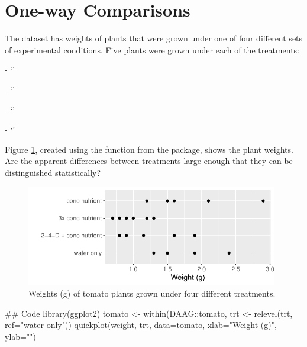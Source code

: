 \section{One-way Comparisons}

The dataset  has weights of plants that were grown
under one of four different sets of experimental conditions.
Five plants were grown under each of the treatments:
\begin{itemizz}
  \item[-] `'
  \item[-] `'
  \item[-] `'
  \item[-] `'
\end{itemizz}
Figure \ref{fig:Tomato}, created
using the function  from the  package,
shows the plant weights.  Are the apparent differences between
treatments large enough that they can be distinguished statistically?

\begin{figure}
\vspace*{-6pt}
\begin{Schunk}


\centerline{\includegraphics[width=0.98\textwidth]{figs/03-gg-tomato-1} }

\end{Schunk}
\caption{Weights (g) of tomato plants grown under four different
  treatments.\label{fig:Tomato}}
\end{figure}

\begin{Schunk}
\begin{Sinput}
## Code
library(ggplot2)
tomato <- within(DAAG::tomato, 
                 trt <- relevel(trt, ref="water only"))
quickplot(weight, trt, data=tomato,
          xlab="Weight (g)", ylab="")
\end{Sinput}
\end{Schunk}

